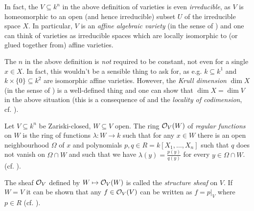 \documentclass[a4paper,parskip=half,numbers=enddot, DIV=12]{scrreprt}
\begin{document}
	\begin{rem*}
		\begin{alphanumerate}
			\item In fact, the $V\subseteq k^n$ in the above definition of varieties is even \emph{irreducible}, as $V$ is homeomorphic to an open (and hence irreducible) subset $U$ of the irreducible space $X$. In particular, $V$ is an \emph{affine algebraic variety} (in the sense of \cite[Definition~2.2.1]{alg1}) and one can think of varieties as irreducible spaces which are locally isomorphic to (or glued together from) affine varieties.
			\item The $n$ in the above definition is \emph{not} required to be constant, not even for a single $x\in X$. In fact, this wouldn't be a sensible thing to ask for, as e.g. $k\subseteq k^1$ and $k\times\{0\}\subseteq k^2$ are isomorphic affine varieties. However, the \emph{Krull dimension} $\dim X$ (in the sense of \cite[Definition~2.1.4]{alg1}) is a well-defined thing and one can show that $\dim X=\dim V$ in the above situation (this is a consequence of \cite[Theorem~6]{alg1} and the \emph{locality of codimension}, cf. \cite[Remark~2.1.3]{alg1}).
		\end{alphanumerate}
	\end{rem*}
	\begin{example}
		    Let $V\subseteq k^n$ be Zariski-closed, $W\subseteq V$ open. The ring $\mathcal{O}_V(W)$ of \emph{regular functions} on $W$ is the ring of functions $\lambda\colon W\to k$ such that for any $x\in W$ there is an open neighbourhood $\Omega$ of $x$ and polynomials $p,q\in R= k[X_1,\ldots,X_n]$ such that $q$ does not vanish on $\Omega\cap W$ and such that we have $\lambda(y) = \frac{p(y)}{q(y)}$ for every $y\in \Omega\cap W$. (cf. \cite[Definition 2.2.2]{alg1}).
		     
		     The sheaf $\mathcal{O}_V$ defined by $W\mapsto \mathcal{O}_V(W)$ is called the \emph{structure sheaf} on $V$. If $W=V$ it can be shown that any $f\in \mathcal{O}_V(V)$ can be written as $f=p|_V$ where $p\in R$ (cf. \cite[Proposition 2.2.2]{alg1}).
	\end{example}
	    
\end{document}
